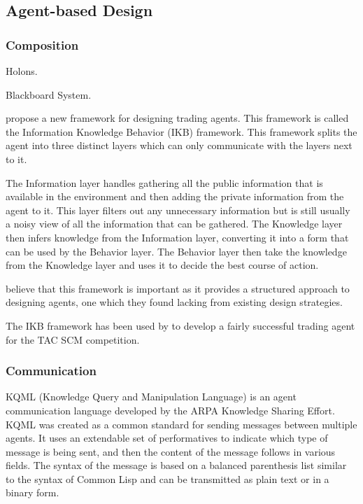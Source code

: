 \subsection{Agent-based Design}

\subsubsection{Composition}

Holons.

Blackboard System.

 propose a new framework for designing trading agents.
This framework is called the Information Knowledge Behavior (IKB) framework.
This framework splits the agent into three distinct layers which can only communicate with the layers next to it.

The Information layer handles gathering all the public information that is available in the environment and then adding the private information from the agent to it.
This layer filters out any unnecessary information but is still usually a noisy view of all the information that can be gathered.
The Knowledge layer then infers knowledge from the Information layer, converting it into a form that can be used by the Behavior layer.
The Behavior layer then take the knowledge from the Knowledge layer and uses it to decide the best course of action.

 believe that this framework is important as it provides a structured approach to designing agents, one which they found lacking from existing design strategies.

The IKB framework has been used by  to develop a fairly successful trading agent for the TAC SCM competition.

\subsubsection{Communication}

KQML (Knowledge Query and Manipulation Language) is an agent communication language developed by the ARPA Knowledge Sharing Effort.
KQML was created as a common standard for sending messages between multiple agents.
It uses an extendable set of performatives to indicate which type of message is being sent, and then the content of the message follows in various fields.
The syntax of the message is based on a balanced parenthesis list similar to the syntax of Common Lisp and can be transmitted as plain text or in a binary form.~\cite{finin1994kqml}

